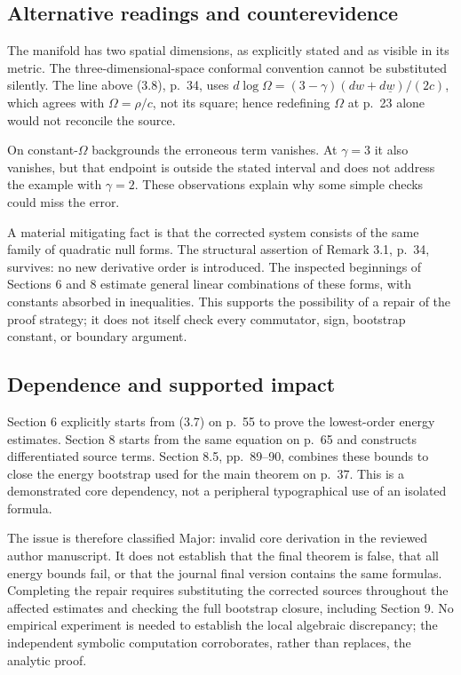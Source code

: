 \documentclass[10pt]{article}
\begin{document}
\subsection*{Alternative readings and counterevidence}
The manifold has two spatial dimensions, as explicitly stated and as visible in its metric. The three-dimensional-space conformal convention cannot be substituted silently. The line above (3.8), p. 34, uses \(d\log\Omega=(3-\gamma)(dw+d\underline{w})/(2c)\), which agrees with \(\Omega=\rho/c\), not its square; hence redefining \(\Omega\) at p. 23 alone would not reconcile the source.\par
On constant-\(\Omega\) backgrounds the erroneous term vanishes. At \(\gamma=3\) it also vanishes, but that endpoint is outside the stated interval and does not address the example with \(\gamma=2\). These observations explain why some simple checks could miss the error.\par
A material mitigating fact is that the corrected system consists of the same family of quadratic null forms. The structural assertion of Remark 3.1, p. 34, survives: no new derivative order is introduced. The inspected beginnings of Sections 6 and 8 estimate general linear combinations of these forms, with constants absorbed in inequalities. This supports the possibility of a repair of the proof strategy; it does not itself check every commutator, sign, bootstrap constant, or boundary argument.\par
\subsection*{Dependence and supported impact}
Section 6 explicitly starts from (3.7) on p. 55 to prove the lowest-order energy estimates. Section 8 starts from the same equation on p. 65 and constructs differentiated source terms. Section 8.5, pp. 89–90, combines these bounds to close the energy bootstrap used for the main theorem on p. 37. This is a demonstrated core dependency, not a peripheral typographical use of an isolated formula.\par
The issue is therefore classified Major: invalid core derivation in the reviewed author manuscript. It does not establish that the final theorem is false, that all energy bounds fail, or that the journal final version contains the same formulas. Completing the repair requires substituting the corrected sources throughout the affected estimates and checking the full bootstrap closure, including Section 9. No empirical experiment is needed to establish the local algebraic discrepancy; the independent symbolic computation corroborates, rather than replaces, the analytic proof.\par
\end{document}
